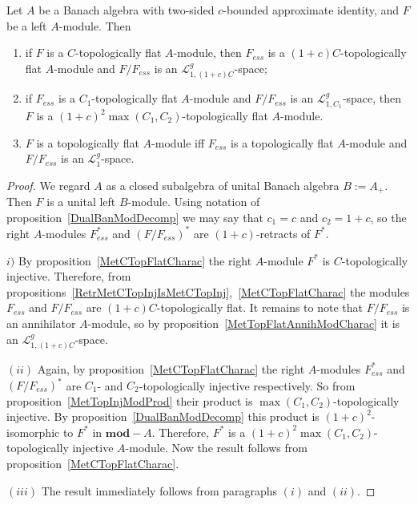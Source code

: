 \begin{proposition}\label{TopFlatModCharac} Let $A$ be a Banach algebra with
two-sided $c$-bounded approximate identity, and $F$ be a left $A$-module. Then

\begin{enumerate}[label = (\roman*)]
    \item if $F$ is a $C$-topologically flat $A$-module, then $F_{ess}$ is a
    $(1+c)C$-topologically flat $A$-module and $F/F_{ess}$ is an
    $\mathscr{L}_{1,(1+c)C}^g$-space;

    \item if $F_{ess}$ is a $C_1$-topologically flat $A$-module and $F/F_{ess}$ is 
    an $\mathscr{L}_{1,C_1}^g$-space, then $F$ is a ${(1+c)}^2\max(C_1,
    C_2)$-topologically flat $A$-module.

    \item $F$ is a topologically flat $A$-module iff $F_{ess}$ is a topologically
    flat $A$-module and $F/F_{ess}$ is an $\mathscr{L}_1^g$-space.
\end{enumerate}
\end{proposition}
\begin{proof} We regard $A$ as a closed subalgebra of unital Banach algebra
$B:=A_+$. Then $F$ is a unital left $B$-module. Using notation of
proposition~\ref{DualBanModDecomp} we may say that $c_1=c$ and $c_2=1+c$, so the
right $A$-modules $F_{ess}^*$ and ${(F/F_{ess})}^*$ are $(1+c)$-retracts of
$F^*$.

$i)$ By proposition~\ref{MetCTopFlatCharac} the right $A$-module $F^*$ is
$C$-topologically injective. Therefore, from
propositions~\ref{RetrMetCTopInjIsMetCTopInj},~\ref{MetCTopFlatCharac} the modules
$F_{ess}$ and $F/F_{ess}$ are $(1+c)C$-topologically flat. It remains to note
that $F/F_{ess}$ is an annihilator $A$-module, so by
proposition~\ref{MetTopFlatAnnihModCharac} it is an
$\mathscr{L}_{1,(1+c)C}^g$-space.

$(ii)$ Again, by proposition~\ref{MetCTopFlatCharac} the right $A$-modules
$F_{ess}^*$ and ${(F/F_{ess})}^*$ are $C_1$- and $C_2$-topologically injective
respectively. So from proposition~\ref{MetTopInjModProd} their product is
$\max(C_1,C_2)$-topologically injective. By proposition~\ref{DualBanModDecomp}
this product is ${(1+c)}^2$-isomorphic to $F^*$ in $\mathbf{mod}-A$. Therefore,
$F^*$ is a ${(1+c)}^2\max(C_1, C_2)$-topologically injective $A$-module. Now the
result follows from proposition~\ref{MetCTopFlatCharac}.

$(iii)$ The result immediately follows from paragraphs $(i)$ and $(ii)$.
\end{proof}

